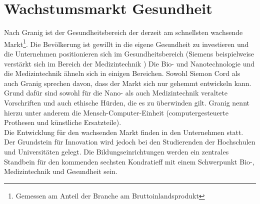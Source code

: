 \section{Wachstumsmarkt Gesundheit}

Nach Granig\cite{nefiodow:gesundheit} ist der Gesundheitsbereich der derzeit am schnellsten wachsende Markt\footnote{Gemessen am Anteil der Branche am Bruttoinlandsprodukt}. Die Bevölkerung ist gewillt in die eigene Gesundheit zu investieren und die Unternehmen positionieren sich im Gesundheitsbereich (Siemens beispielweise verstärkt sich im Bereich der Medizintechnik \cite[S.111, 112]{nefiodow:gesundheit})
Die Bio- und Nanotechnologie und die Medizintechnik ähneln sich in einigen Bereichen. Sowohl Siemon Cord \cite{cord:innovation} als auch Granig \cite[Seite 116 f]{nefiodow:gesundheit} sprechen davon, dass der Markt sich nur gehemmt entwickeln kann. Grund dafür sind sowohl für die Nano- als auch Medizintechnik veraltete Vorschriften und auch ethische Hürden, die es zu überwinden gilt. Granig nennt hierzu unter anderem die Mensch-Computer-Einheit \cite[S.117]{nefiodow:gesundheit}(computergesteuerte Prothesen und künstliche Ersatzteile).\\
Die Entwicklung für den wachsenden Markt finden in den Unternehmen statt. Der Grundstein für Innovation wird jedoch bei den Studierenden der Hochschulen und Universitäten gelegt. Die Bildungseinrichtungen werden ein zentrales Standbein für den kommenden sechsten Kondratieff mit einem Schwerpunkt Bio-, Medizintechnik und Gesundheit sein.


